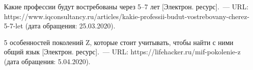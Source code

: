 \begin{thebibliography}{99}
\bibitem{}\BibAuthor{}Какие профессии будут востребованы через 5--7 лет [Электрон. ресурс].~--- URL: https://www.iqconsultancy.ru/articles/kakie-professii-budut-vostrebovany-cherez-5-7-let (дата обращения: 25.03.2020).

\bibitem{}\BibAuthor{}5 особенностей поколений Z, которые стоит учитывать, чтобы найти с ними общий язык [Электрон. ресурс].~--- URL: https://lifehacker.ru/mif-pokolenie-z (дата обращения: 5.04.2020).
\end{thebibliography}
\thispagestyle{empty}
